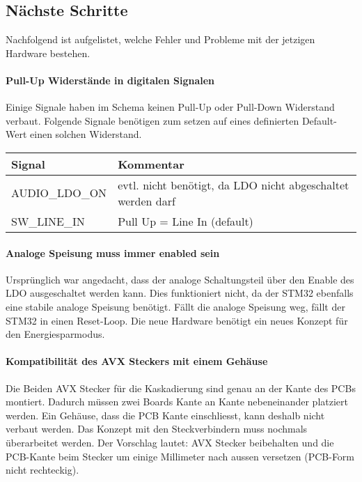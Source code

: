 \clearpage

\subsection{Nächste Schritte}

Nachfolgend ist aufgelistet, welche Fehler und Probleme mit der jetzigen Hardware bestehen.

\paragraph{Pull-Up Widerstände in digitalen Signalen}

Einige Signale haben im Schema keinen Pull-Up oder Pull-Down Widerstand verbaut.
Folgende Signale benötigen zum setzen auf eines definierten Default-Wert einen solchen Widerstand.
\begin{table}[H]
	\centering
	\begin{tabular}{|l|l|}
		\hline
		\textbf{Signal} & \textbf{Kommentar}                                          \\ \hline
		AUDIO\_LDO\_ON  & evtl. nicht benötigt, da LDO nicht abgeschaltet werden darf \\ \hline
		SW\_LINE\_IN    & Pull Up = Line In (default)                                 \\ \hline
	\end{tabular}
\end{table}

\paragraph{Analoge Speisung muss immer enabled sein}

Ursprünglich war angedacht, dass der analoge Schaltungsteil über den Enable des LDO ausgeschaltet werden kann. Dies funktioniert nicht, da der STM32 ebenfalls eine stabile analoge Speisung benötigt. Fällt die analoge Speisung weg, fällt der STM32 in einen Reset-Loop.
Die neue Hardware benötigt ein neues Konzept für den Energiesparmodus.

\paragraph{Kompatibilität des AVX Steckers mit einem Gehäuse}

Die Beiden AVX Stecker für die Kaskadierung sind genau an der Kante des PCBs montiert. Dadurch müssen zwei Boards Kante an Kante nebeneinander platziert werden.
Ein Gehäuse, dass die PCB Kante einschliesst, kann deshalb nicht verbaut werden.
Das Konzept mit den Steckverbindern muss nochmals überarbeitet werden.
Der Vorschlag lautet: AVX Stecker beibehalten und die PCB-Kante beim Stecker um einige Millimeter nach aussen versetzen (PCB-Form nicht rechteckig).

